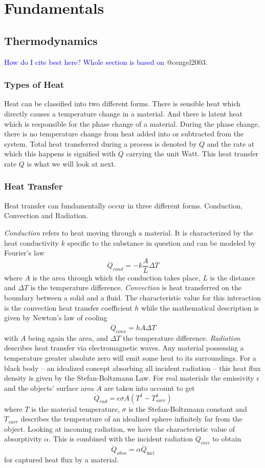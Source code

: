 \chapter{Fundamentals}
\label{chap:fundamentals}

\section{Thermodynamics}
\textcolor{Blue}{How do I cite best here? Whole section is based on} @cengel2003.

\subsection{Types of Heat}
Heat can be classified into two different forms.
There is sensible heat which directly causes a temperature change in a material.
And there is latent heat which is responsible for the phase change of a material.
During the phase change, there is no temperature change from heat added into or subtracted from the system.
Total heat transferred during a process is denoted by $Q$ and the rate at which this happens is signified with $\dot{Q}$ carrying the unit Watt.
This heat transfer rate $\dot{Q}$ is what we will look at next.

\subsection{Heat Transfer}
Heat transfer can fundamentally occur in three different forms.
Conduction, Convection and Radiation.

\textit{Conduction} refers to heat moving through a material.
It is characterized by the heat conductivity $k$ specific to the substance in question and can be modeled by Fourier's law
$$
\dot{Q}_{cond} = -k \frac{A}{L} \Delta T
$$
where $A$ is the area through which the conduction takes place, $L$ is the distance and $\Delta T$ is the temperature difference.
\textit{Convection} is heat transferred on the boundary between a solid and a fluid.
The characteristic value for this interaction is the convection heat transfer coefficient $h$ while the mathematical description is given by Newton's law of cooling
$$
\dot{Q}_{conv} = h A \Delta T
$$
with $A$ being again the area, and $\Delta T$ the temperature difference.
\textit{Radiation} describes heat transfer via electromagnetic waves.
Any material possessing a temperature greater absolute zero will emit some heat to its surroundings.
For a black body -- an idealized concept absorbing all incident radiation -- this heat flux density is given by the Stefan-Boltzmann Law.
For real materials the emissivity $\epsilon$ and the objects' surface area $A$ are taken into account to get
$$
\dot{Q}_{rad} = \epsilon \sigma A (T^4 - T_{surr}^4)
$$
where $T$ is the material temperature, $\sigma$ is the Stefan-Boltzmann constant and $T_{surr}$ describes the temperature of an idealized sphere infinitely far from the object.
Looking at incoming radiation, we have the characteristic value of absorptivity $\alpha$.
This is combined with the incident radiation $\dot{Q}_{inci}$ to obtain 
$$
\dot{Q}_{abso} = \alpha \dot{Q}_{\text{inci}} 
$$
for captured heat flux by a material.

